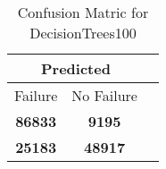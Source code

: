 \begin{table}[] 
\caption{Confusion Matric for DecisionTrees100} 
\label{Table: Prediction Accuracy-DMDDecisionTrees100OnlySunEKF-ignoreReflection-Reflection} 
\centering 
\begin{tabular} 
 {@{}ccc@{}} 
\toprule 
\multicolumn{2}{c}{\textbf{Predicted}}
 \\ \midrule 
\multicolumn{1}{|c|}{Failure} & 
\multicolumn{1}{c|}{No Failure}
 \\ \midrule 
\multicolumn{1}{|c|}{\color{green}\textbf{86833}} & 
\multicolumn{1}{c|}{\color{red}\textbf{9195}}
 \\ \midrule 
\multicolumn{1}{|c|}{\color{red}\textbf{25183}} & 
\multicolumn{1}{c|}{\color{green}\textbf{48917}}
 \\ \bottomrule 
\end{tabular} 
\end{table} 
